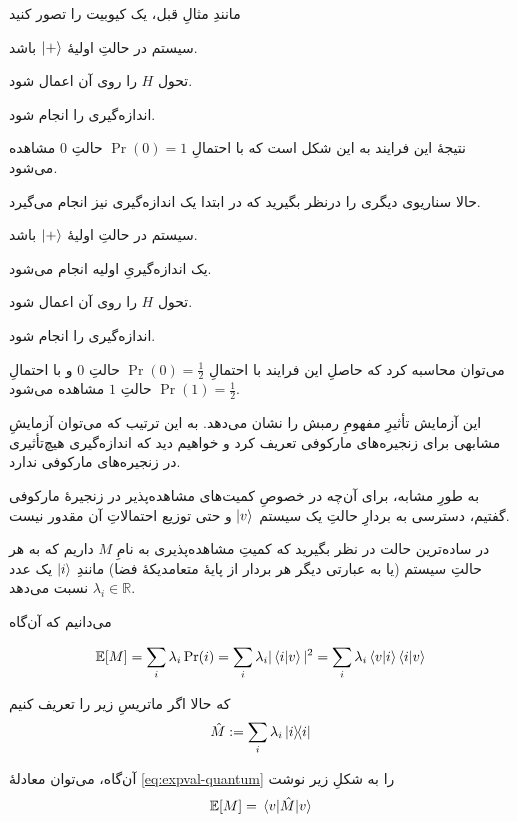 مانندِ مثالِ قبل، یک کیوبیت را تصور کنید 

 سیستم در حالتِ اولیهٔ 
\(\ket{+}\)
باشد.

 تحول \(H\) را روی آن اعمال شود.

 اندازه‌گیری را انجام شود.

نتیجهٔ این فرایند به این شکل است که با احتمالِ
\(\Pr(0) = 1\)
حالتِ \(0\) مشاهده می‌شود.

حالا سناریوی دیگری را درنظر بگیرید که در ابتدا یک اندازه‌گیری نیز انجام می‌گیرد.

 سیستم در حالتِ اولیهٔ 
\(\ket{+}\)
باشد.

 یک اندازه‌گیریِ اولیه انجام می‌شود.

 تحول \(H\) را روی آن اعمال شود.

 اندازه‌گیری را انجام شود.

می‌توان محاسبه کرد که حاصلِ این فرایند با احتمالِ
\(\Pr(0) = \frac{1}{2}\)
حالتِ \(0\) و با احتمالِ
\(\Pr(1) = \frac{1}{2}\)
حالتِ \(1\) مشاهده می‌شود.

این آزمایش تأثیرِ مفهومِ رمبش را نشان می‌دهد. به این ترتیب که می‌توان آزمایشِ مشابهی برای زنجیره‌های مارکوفی تعریف کرد و خواهیم دید که اندازه‌گیری هیچ‌تأثیری در زنجیره‌های مارکوفی ندارد.


به طورِ مشابه، برای آن‌چه در خصوصِ کمیت‌های مشاهده‌پذیر در زنجیرهٔ مارکوفی گفتیم، دسترسی به بردارِ حالتِ یک سیستم 
\(\ket{v}\)
و حتی توزیع احتمالاتِ آن مقدور نیست.

در ساده‌ترین حالت در نظر بگیرید که کمیتِ مشاهده‌پذیری به نامِ \(M\) داریم که به هر حالتِ سیستم (یا به عبارتی دیگر هر بردار از پایهٔ متعامد‌یکهٔ فضا) مانندِ 
\(\ket{i}\)
یک عدد 
\(\lambda_i \in \mathbb{R}\)
نسبت می‌دهد.

می‌دانیم که آن‌گاه

\begin{equation} \mathbb{E}[M] = \sum_i \lambda_i \Pr(i) = \sum_i \lambda_i |\braket{i}{v}|^2 = \sum_i \lambda_i \braket{v}{i}\braket{i}{v} 
\label{eq:expval-quantum} \end{equation}

که حالا اگر ماتریسِ زیر را تعریف کنیم
\begin{equation} \hat{M} := \sum_i \lambda_i \dyad{i} \end{equation}

آن‌گاه، می‌توان معادلهٔ 
\ref{eq:expval-quantum}
را به شکلِ زیر نوشت
\begin{equation} \mathbb{E}[M] = \ev{\hat{M}}{v} \end{equation}

